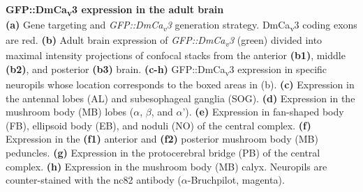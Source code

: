 \label{fig:2} 
\textbf{GFP::DmCa\textsubscript{v}3 expression in the adult brain} 
\\ 
\textbf{(a)} Gene targeting and \emph{GFP::DmCa\textsubscript{v}3} generation strategy. 
DmCa\textsubscript{v}3 coding exons are red.
\textbf{(b)} Adult brain expression of \emph{GFP::DmCa\textsubscript{v}3} (green) divided into maximal intensity projections of confocal stacks from the anterior \textbf{(b1)}, middle \textbf{(b2)}, and posterior \textbf{(b3)} brain.
\textbf{(c-h)} GFP::DmCa\textsubscript{v}3 expression in specific neuropils whose location corresponds to the boxed areas in (b).
\textbf{(c)} Expression in the antennal lobes (AL) and subesophageal ganglia (SOG).
\textbf{(d)} Expression in the mushroom body (MB) lobes ($\alpha$, $\beta$, and $\alpha$'). 
\textbf{(e)} Expression in fan-shaped body (FB), ellipsoid body (EB), and noduli (NO) of the central complex.
\textbf{(f)} Expression in the \textbf{(f1)} anterior and \textbf{(f2)} posterior mushroom body (MB) peduncles.
\textbf{(g)} Expression in the protocerebral bridge (PB) of the central complex. 
\textbf{(h)} Expression in the mushroom body (MB) calyx. 
Neuropils are counter-stained with the nc82 antibody ($\alpha$-Bruchpilot, magenta).
